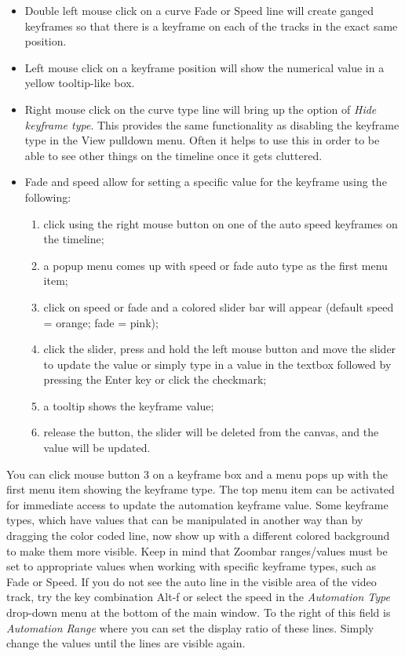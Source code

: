 \begin{itemize}
    \item Double left mouse click on a curve Fade or Speed line will create ganged keyframes so that there is a
    keyframe on each of the tracks in the exact same position.
    \item Left mouse click on a keyframe position will show the numerical value in a yellow tooltip-like box.
    \item Right mouse click on the curve type line will bring up the option of \textit{Hide keyframe type}.   This
    provides the same functionality as disabling the keyframe type in the View pulldown menu.  Often it
    helps to use this in order to be able to see other things on the timeline once it gets cluttered.
    \item Fade and speed allow for setting a specific value for the keyframe using the following:
    \begin{enumerate}
        \item click using the right mouse button on one of the auto speed keyframes on the timeline;
        \item a popup menu comes up with speed or fade auto type as the first menu item;
        \item click on speed or fade and a colored slider bar will appear (default speed = orange; fade = pink);
        \item click the slider, press and hold the left mouse button and move the slider to update the value or
        simply type in a value in the textbox followed by pressing the Enter key or click the checkmark;
        \item a tooltip shows the keyframe value;
        \item release the button, the slider will be deleted from the canvas, and the value will be updated.
    \end{enumerate}
\end{itemize}

You can click mouse button 3 on a keyframe box and a menu pops up with the first menu item showing the keyframe type.  The top menu item can be activated for immediate access to update the automation keyframe value.  Some keyframe types, which have values that can be manipulated in another way than by dragging the color coded line, now show up with a different colored background to make them more visible.  Keep in mind that Zoombar ranges/values must be set to appropriate values when working with specific keyframe types, such as Fade or Speed.  If you do not see the auto line in the visible area of the video track, try the key combination Alt-f or select the speed in the \textit{Automation Type} drop-down menu at the bottom of the main window.  To the right of this field is \textit{Automation Range} where you can set the display ratio of these lines. Simply change the values until the lines are visible again. 

